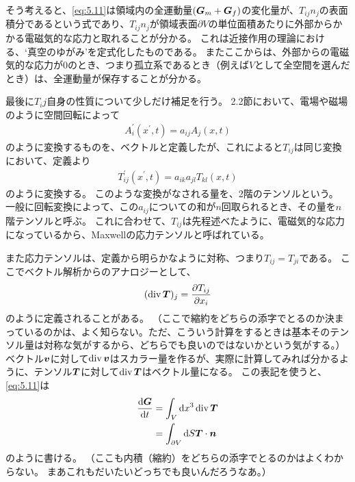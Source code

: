 \documentclass[a4paper]{jsarticle}
\def\vec#1{\mbox{\boldmath $#1$}}
\newcommand{\dif}[2]{\frac{{\rm d} #1}{{\rm d} #2}}
\newcommand{\pdif}[2]{\frac{\partial #1}{\partial #2}}
\newcommand{\ddif}{{\rm d}}
\DeclareMathOperator{\Div}{div}
\begin{document}
そう考えると、\eqref{eq:5.11}は領域内の全運動量$(\vec{G}_m + \vec{G}_f)$の変化量が、$T_{ij}n_j$の表面積分であるという式であり、$T_{ij}n_j$が領域表面$\partial V$の単位面積あたりに外部からかかる電磁気的な応力と取れることが分かる。
これは近接作用の理論における、`真空のゆがみ'を定式化したものである。
またここからは、外部からの電磁気的な応力が0のとき、つまり孤立系であるとき（例えば$V$として全空間を選んだとき）は、全運動量が保存することが分かる。

最後に$T_ij$自身の性質について少しだけ補足を行う。
2.2節において、電場や磁場のように空間回転によって
\begin{align}
	A^{\prime}_i(x^{\prime}, t) = a_{ij} A_j(x, t)
\end{align}
のように変換するものを、ベクトルと定義したが、これによると$T_{ij}$は同じ変換において、定義より
\begin{align}
	T^{\prime}_{ij}(x^{\prime}, t) = a_{ik} a_{jl} T_{kl}(x, t)
\end{align}
のように変換する。
このような変換がなされる量を、2階のテンソルという。
一般に回転変換によって、この$a_{ij}$についての和が$n$回取られるとき、その量を$n$階テンソルと呼ぶ。
これに合わせて、$T_{ij}$は先程述べたように、電磁気的な応力になっているから、Maxwellの応力テンソルと呼ばれている。

また応力テンソルは、定義から明らかなように対称、つまり$T_{ij}=T_{ji}$である。
ここでベクトル解析からのアナロジーとして、
\begin{align}
	(\Div \vec{T})_j = \pdif{T_{ij}}{x_i}
\end{align}
のように定義されることがある。
（ここで縮約をどちらの添字でとるのか決まっているのかは、よく知らない。ただ、こういう計算をするときは基本そのテンソル量は対称な気がするから、どちらでも良いのではないかという気がする。）
ベクトル$\vec{v}$に対して$\Div \vec{v}$はスカラー量を作るが、実際に計算してみれば分かるように、テンソル$\vec{T}$に対して$\Div \vec{T}$はベクトル量になる。
この表記を使うと、\eqref{eq:5.11}は
\begin{align}
	\dif{\vec{G}}{t} &= \int_V \ddif x^3 \Div \vec{T} \\
	&= \int_{\partial V} \ddif S \vec{T} \cdot \vec{n}
\end{align}
のように書ける。
（ここも内積（縮約）をどちらの添字でとるのかはよくわからない。
まあこれもだいたいどっちでも良いんだろうなあ。）
\end{document}
